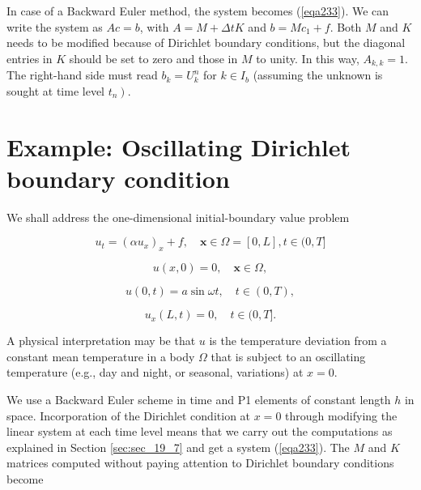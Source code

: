 \documentclass[../main.tex]{subfiles}
\begin{document}
		In case of a Backward Euler method, the system becomes (\ref{eqa233}). We can write the system as $A c=b$, with $A=M+\Delta t K$ and $b=M c_{1}+f$. Both $M$ and $K$ needs to be modified because of Dirichlet boundary conditions, but the diagonal entries in $K$ should be set to zero and those in $M$ to unity. In this way, $A_{k, k}=1$. The right-hand side must read $b_{k}=U_{k}^{n}$ for $k \in I_{b}$ (assuming the unknown is sought at time level $\left.t_{n}\right)$.
	\section[Example: Oscillating Dirichlet boundary condition]{Example: Oscillating Dirichlet boundary condition}
		\label{sec:sec_19_9}
		 \noindent We shall address the one-dimensional initial-boundary value problem
		 
		\begin{equation}
		\label{240}
			u_{t}=\left(\alpha u_{x}\right)_{x}+f, \quad \boldsymbol{x} \in \Omega=[0, L], t \in(0, T]
		\end{equation}
	
		\begin{equation}
	 	\label{241}
			u(x, 0)=0, \quad \boldsymbol{x} \in \Omega,
		\end{equation}
	
		\begin{equation}
		\label{eqa242}
			u(0, t)=a \sin \omega t, \quad t \in(0, T),
		\end{equation}
	
		\begin{equation}
		\label{eqa243}
			u_{x}(L, t)=0, \quad t \in(0, T] .
		\end{equation}
	
		 \noindent A physical interpretation may be that $u$ is the temperature deviation from a constant mean temperature in a body $\Omega$ that is subject to an oscillating temperature (e.g., day and night, or seasonal, variations) at $x=0$.
		 
		 We use a Backward Euler scheme in time and P1 elements of constant length $h$ in space. Incorporation of the Dirichlet condition at $x=0$ through modifying the linear system at each time level means that we carry out the computations as explained in Section \ref{sec:sec_19_7} and get a system (\ref{eqa233}). The $M$ and $K$ matrices computed without paying attention to Dirichlet boundary conditions become
		 
\end{document}
